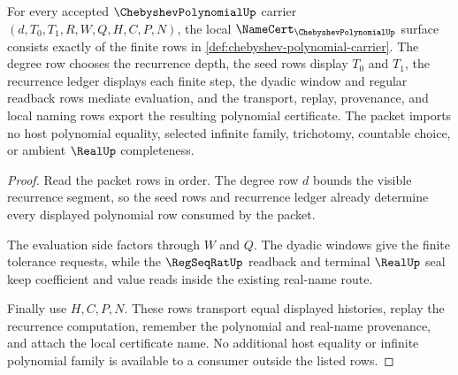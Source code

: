 \begin{theorem}\label{thm:chebyshev-polynomial-namecert-obligations}
For every accepted $\ChebyshevPolynomialUp$ carrier $(d,T_0,T_1,R,W,Q,H,C,P,N)$, the local $\NameCert_{\ChebyshevPolynomialUp}$ surface consists exactly of the finite rows in \autoref{def:chebyshev-polynomial-carrier}. The degree row chooses the recurrence depth, the seed rows display $T_0$ and $T_1$, the recurrence ledger displays each finite step, the dyadic window and regular readback rows mediate evaluation, and the transport, replay, provenance, and local naming rows export the resulting polynomial certificate. The packet imports no host polynomial equality, selected infinite family, trichotomy, countable choice, or ambient $\RealUp$ completeness.
\end{theorem}
\begin{proof}
Read the packet rows in order. The degree row $d$ bounds the visible recurrence segment, so the seed rows and recurrence ledger already determine every displayed polynomial row consumed by the packet.

The evaluation side factors through $W$ and $Q$. The dyadic windows give the finite tolerance requests, while the $\RegSeqRatUp$ readback and terminal $\RealUp$ seal keep coefficient and value reads inside the existing real-name route.

Finally use $H,C,P,N$. These rows transport equal displayed histories, replay the recurrence computation, remember the polynomial and real-name provenance, and attach the local certificate name. No additional host equality or infinite polynomial family is available to a consumer outside the listed rows.
\end{proof}

